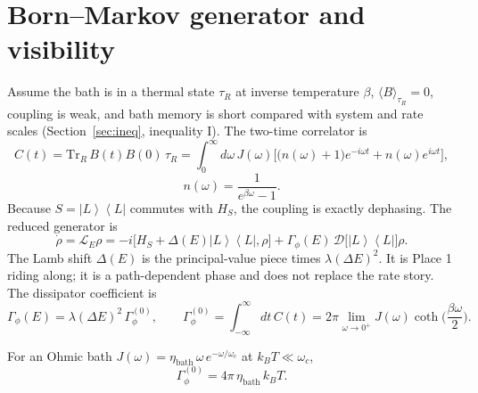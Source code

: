 \documentclass[11pt]{article}
\theoremstyle{definition}
\theoremstyle{plain}
\newcommand{\ket}[1]{\left|{#1}\right\rangle}
\newcommand{\bra}[1]{\left\langle{#1}\right|}
\newcommand{\LR}{\ket{L}\!\bra{L}}
\begin{document}
\section{Born--Markov generator and visibility}\label{sec:bornmarkov}

Assume the bath is in a thermal state $\tau_R$ at inverse temperature $\beta$, $\langle B\rangle_{\tau_R} = 0$,
coupling is weak, and bath memory is short compared with system and rate scales
(Section~\ref{sec:ineq}, inequality I). The two-time correlator is
\begin{equation}
C(t) = \mathrm{Tr}_R\, B(t)B(0)\,\tau_R = \int_0^\infty \!\! d\omega\, J(\omega) \Big[ \big( n(\omega)+1 \big) e^{-i\omega t} + n(\omega) e^{i\omega t} \Big],
\label{eq:C}
\end{equation}
\begin{equation}
n(\omega) = \frac{1}{e^{\beta\omega} - 1}.
\label{eq:n}
\end{equation}
Because $S = \LR$ commutes with $H_S$, the coupling is exactly dephasing. The reduced generator is
\begin{equation}
\dot\rho = \mathcal{L}_E \rho = -i\big[ H_S + \Delta(E)\LR, \rho \big] + \Gamma_\phi(E)\, \mathcal{D}\big[ \LR \big] \rho.
\label{eq:gen}
\end{equation}
The Lamb shift $\Delta(E)$ is the principal-value piece times $\lambda(\Delta E)^2$. It is Place 1 riding
along; it is a path-dependent phase and does not replace the rate story. The dissipator coefficient is
\begin{equation}
\Gamma_\phi(E) = \lambda(\Delta E)^2\, \Gamma_\phi^{(0)}, \qquad
\Gamma_\phi^{(0)} = \int_{-\infty}^{\infty} dt\, C(t) = 2\pi \lim_{\omega\to 0^+} J(\omega) \coth\!\Big( \frac{\beta\omega}{2}\Big).
\label{eq:gamma0}
\end{equation}

For an Ohmic bath $J(\omega) = \eta_{\mathrm{bath}}\, \omega\, e^{-\omega/\omega_c}$ at $k_B T \ll \omega_c$,
\begin{equation}
\Gamma_\phi^{(0)} = 4\pi\, \eta_{\mathrm{bath}}\, k_B T.
\label{eq:ohmic}
\end{equation}
\end{document}
